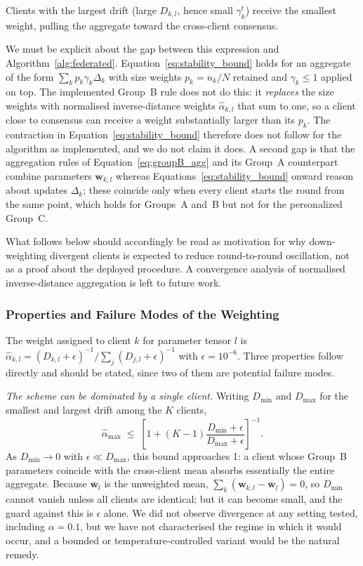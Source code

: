 \documentclass{ieeeaccess}
\begin{document}
Clients with the largest drift (large $D_{k,l}$, hence small $\gamma_k^t$) receive the smallest weight, pulling the aggregate toward the cross-client consensus.

We must be explicit about the gap between this expression and Algorithm~\ref{alg:federated}. Equation~\eqref{eq:stability_bound} holds for an aggregate of the form $\sum_k p_k \gamma_k \Delta_k$ with size weights $p_k = n_k/N$ retained and $\gamma_k \le 1$ applied on top. The implemented Group~B rule does not do this: it \emph{replaces} the size weights with normalised inverse-distance weights $\hat{\alpha}_{k,l}$ that sum to one, so a client close to consensus can receive a weight substantially larger than its $p_k$. The contraction in Equation~\eqref{eq:stability_bound} therefore does not follow for the algorithm as implemented, and we do not claim it does. A second gap is that the aggregation rules of Equation~\eqref{eq:groupB_agg} and its Group~A counterpart combine parameters $\mathbf{w}_{k,l}$ whereas Equations~\eqref{eq:stability_bound} onward reason about updates $\Delta_k$; these coincide only when every client starts the round from the same point, which holds for Groups~A and~B but not for the personalized Group~C.

What follows below should accordingly be read as motivation for why down-weighting divergent clients is expected to reduce round-to-round oscillation, not as a proof about the deployed procedure. A convergence analysis of normalised inverse-distance aggregation is left to future work.

\subsubsection{Properties and Failure Modes of the Weighting}
\label{sec:weight_analysis}

The weight assigned to client $k$ for parameter tensor $l$ is
$\hat{\alpha}_{k,l} = (D_{k,l}+\epsilon)^{-1} / \sum_j (D_{j,l}+\epsilon)^{-1}$
with $\epsilon = 10^{-6}$. Three properties follow directly and should be stated, since two of them are potential failure modes.

\emph{The scheme can be dominated by a single client.} Writing $D_{\min}$ and $D_{\max}$ for the smallest and largest drift among the $K$ clients,
\begin{equation}
\hat{\alpha}_{\max} \;\le\; \left[1 + (K-1)\frac{D_{\min}+\epsilon}{D_{\max}+\epsilon}\right]^{-1} .
\end{equation}
As $D_{\min} \to 0$ with $\epsilon \ll D_{\max}$, this bound approaches 1: a client whose Group~B parameters coincide with the cross-client mean absorbs essentially the entire aggregate. Because $\bar{\mathbf{w}}_l$ is the unweighted mean, $\sum_k (\mathbf{w}_{k,l} - \bar{\mathbf{w}}_l) = 0$, so $D_{\min}$ cannot vanish unless all clients are identical; but it can become small, and the guard against this is $\epsilon$ alone. We did not observe divergence at any setting tested, including $\alpha{=}0.1$, but we have not characterised the regime in which it would occur, and a bounded or temperature-controlled variant would be the natural remedy.
\end{document}
